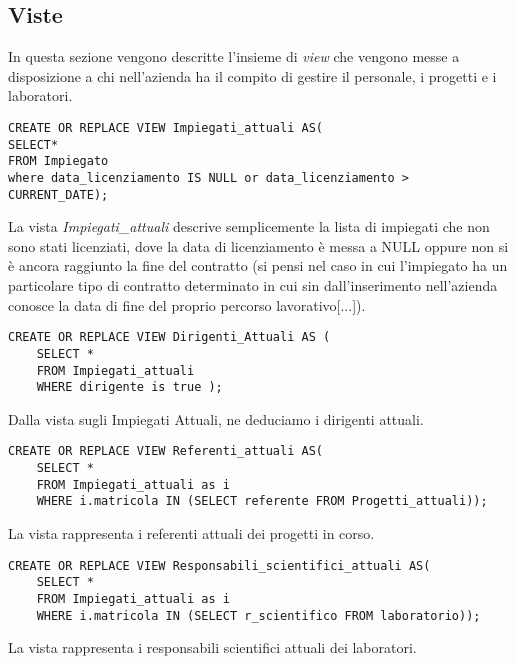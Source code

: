 \normalsize

\newpage
\subsection{Viste}
\begin{itemize}
In questa sezione vengono descritte l'insieme di \textit{view} che vengono messe a disposizione a chi nell'azienda ha il compito di gestire il personale, i progetti e i laboratori.

\begin{lstlisting}
CREATE OR REPLACE VIEW Impiegati_attuali AS(
SELECT*
FROM Impiegato
where data_licenziamento IS NULL or data_licenziamento > CURRENT_DATE);
\end{lstlisting}

 La vista \textit{Impiegati\_attuali} descrive semplicemente la lista di impiegati che non sono stati licenziati, dove la data di licenziamento è messa a NULL oppure non si è ancora raggiunto la fine del contratto (si pensi nel caso in cui l'impiegato ha un particolare tipo di contratto determinato in cui sin dall'inserimento nell'azienda conosce la data di fine del proprio percorso lavorativo[...]).\\

\begin{lstlisting}
CREATE OR REPLACE VIEW Dirigenti_Attuali AS (
    SELECT *
    FROM Impiegati_attuali
    WHERE dirigente is true );
\end{lstlisting}

Dalla vista sugli Impiegati Attuali, ne deduciamo i dirigenti attuali.\\

\begin{lstlisting}
CREATE OR REPLACE VIEW Referenti_attuali AS(
    SELECT *
    FROM Impiegati_attuali as i
    WHERE i.matricola IN (SELECT referente FROM Progetti_attuali));
\end{lstlisting}
La vista rappresenta i referenti attuali dei progetti in corso.\\

\newpage
\begin{lstlisting}
CREATE OR REPLACE VIEW Responsabili_scientifici_attuali AS(
    SELECT *
    FROM Impiegati_attuali as i 
    WHERE i.matricola IN (SELECT r_scientifico FROM laboratorio));
\end{lstlisting}
La vista rappresenta i responsabili scientifici attuali dei laboratori. \\



\end{itemize}
